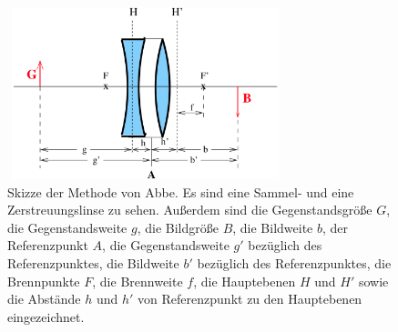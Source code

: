 \begin{figure}
    \centering
    \includegraphics[width=8cm, height=5cm]{build/abbe.png}
    \caption{Skizze der Methode von Abbe. Es sind eine Sammel- und eine Zerstreuungslinse zu sehen. Außerdem sind die Gegenstandsgröße $G$, die Gegenstandsweite $g$, die Bildgröße $B$, die Bildweite $b$, der Referenzpunkt $A$, die Gegenstandsweite $g'$ bezüglich des Referenzpunktes, die Bildweite $b'$ bezüglich des Referenzpunktes, die Brennpunkte $F$, die Brennweite $f$, die Hauptebenen $H$ und $H'$ sowie die Abstände $h$ und $h'$ von Referenzpunkt zu den Hauptebenen eingezeichnet. \cite{V408}}
    \label{fig:abbe}
\end{figure}
